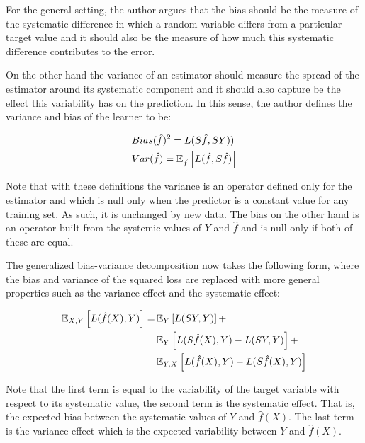 For the general setting, the author argues that the bias should be the measure of the systematic difference in which a random variable differs from a particular target value and it should also be the measure of how much this systematic difference contributes to the error.

On the other hand the variance of an estimator should measure the spread of the estimator around its systematic component and it should also capture be the effect this variability has on the prediction. In this sense, the author defines the variance and bias of the learner to be:

\begin{equation}
\begin{split}
& Bias(\hat{f})^2 = L(S\hat{f},SY)) \\
& Var(\hat{f}) = \operatorname{\mathbb{E}}_{\hat{f}} \left[ L(\hat{f} , S\hat{f}) \right]
\end{split}
\end{equation}

Note that with these definitions the variance is an operator defined only for the estimator and which is null only when the predictor is a constant value for any training set. As such, it is unchanged by new data. The bias on the other hand is an operator built from the systemic values of $Y$ and $\hat{f}$ and is null only if both of these are equal.


The generalized bias-variance decomposition now takes the following form, where the bias and variance of the squared loss are replaced with more general properties such as the variance effect and the systematic effect:

\begin{equation}
\begin{split}
\operatorname{\mathbb{E}}_{X,Y} \left[ L(\hat{f}(X),Y )\right] = & \operatorname{\mathbb{E}}_{Y} \left[ L(SY,Y )\right] + \\
 & \operatorname{\mathbb{E}}_{Y} \left[ L(S\hat{f}(X),Y ) - L(SY,Y )\right] + \\
 & \operatorname{\mathbb{E}}_{Y,X} \left[ L(\hat{f}(X),Y ) - L(S\hat{f}(X),Y )\right]
\end{split}
\end{equation}

Note that the first term is equal to the variability of the target variable with respect to its systematic value, the second term is the systematic effect. That is, the expected bias between the systematic values of $Y$ and $\hat{f}(X)$. The last term is the variance effect which is the expected variability between $Y$ and $\hat{f}(X)$.

